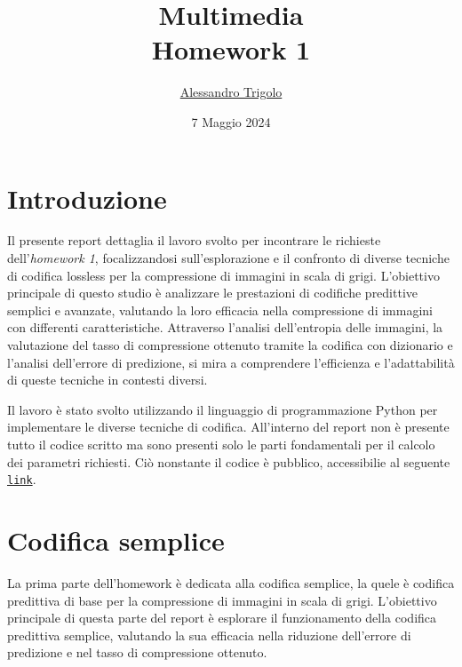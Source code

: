 \title{\vspace{160px} \textbf{\huge{Multimedia}} \\\vspace{17.5px} \LARGE{Homework 1}  \vspace{10px}}
\author{\href{https://github.com/imAlessas}{Alessandro Trigolo}}
\date{7 Maggio 2024}



\maketitle\newpage

\tableofcontents
\vspace{50px}
\listoffigures
\newpage


\section*{Introduzione}
Il presente report dettaglia il lavoro svolto per incontrare le richieste dell'\textsl{homework 1}, focalizzandosi sull'esplorazione e il confronto di diverse tecniche di codifica lossless per la compressione di immagini in scala di grigi. L'obiettivo principale di questo studio è analizzare le prestazioni di codifiche predittive semplici e avanzate, valutando la loro efficacia nella compressione di immagini con differenti caratteristiche. Attraverso l'analisi dell'entropia delle immagini, la valutazione del tasso di compressione ottenuto tramite la codifica con dizionario e l'analisi dell'errore di predizione, si mira a comprendere l'efficienza e l'adattabilità di queste tecniche in contesti diversi.

Il lavoro è stato svolto utilizzando il linguaggio di programmazione Python per implementare le diverse tecniche di codifica. All'interno del report non è presente tutto il codice scritto ma sono presenti solo le parti fondamentali per il calcolo dei parametri richiesti. Ciò nonstante il codice è pubblico, accessibilie al seguente \texttt{\href{https://github.com/imAlessas/computer-networks/tree/main/multimedia/hw-1/script}{link}}.




\newpage\section{Codifica semplice} 
La prima parte dell'homework è dedicata alla codifica semplice, la quele è codifica predittiva di base per la compressione di immagini in scala di grigi. L'obiettivo principale di questa parte del report è esplorare il funzionamento della codifica predittiva semplice, valutando la sua efficacia nella riduzione dell'errore di predizione e nel tasso di compressione ottenuto.

